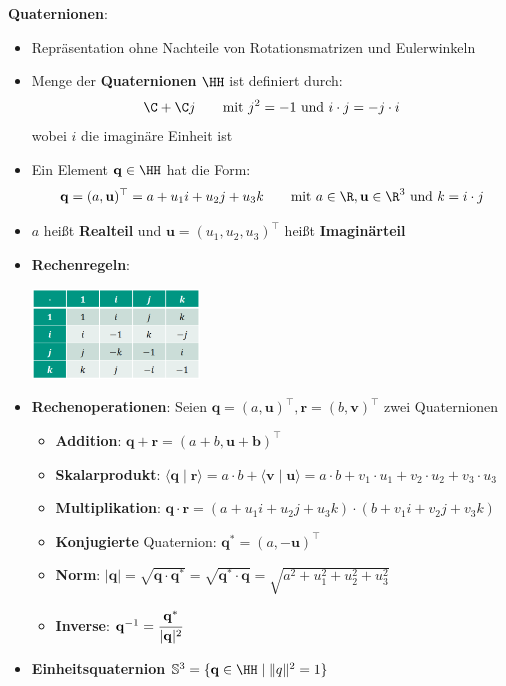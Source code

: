 \bigskip
\textbf{Quaternionen}:
\begin{itemize}
	\item Repräsentation ohne Nachteile von Rotationsmatrizen und Eulerwinkeln
	\item Menge der \textbf{Quaternionen} $\HH$ ist definiert durch:
	$$\C+\C j\qquad \text{mit } j^2=-1 \text{ und } i\cdot j=-j\cdot i$$
	wobei $i$ die imaginäre Einheit ist
	\item Ein Element $\mathbf{q}\in\HH$ hat die Form:
	$$\mathbf{q}=(a,\mathbf{u})^\top=a+u_1i+u_2j+u_3k\qquad \text{mit } a\in\R,\mathbf{u}\in\R^3\text{ und }k=i\cdot j$$
	\item $a$ heißt \textbf{Realteil} und $\mathbf{u}=(u_1,u_2,u_3)^\top$ heißt \textbf{Imaginärteil}
	\item \textbf{Rechenregeln}:
	\begin{center}
		\includegraphics[width=0.35\textwidth]{images/quaternionen.png}
	\end{center}
	\item \textbf{Rechenoperationen}: Seien $\mathbf{q}=(a,\mathbf{u})^\top, \mathbf{r}=(b,\mathbf{v})^\top$ zwei Quaternionen
	\begin{itemize}
		\item \textbf{Addition}: $\mathbf{q}+\mathbf{r}=(a+b,\mathbf{u}+\mathbf{b})^\top$
		\item \textbf{Skalarprodukt}: $\langle \mathbf{q}\mid\mathbf{r}\rangle=a\cdot b+\langle \mathbf{v}\mid\mathbf{u}\rangle=a\cdot b+v_1\cdot u_1+v_2\cdot u_2+v_3\cdot u_3$
		\item \textbf{Multiplikation}: $\mathbf{q}\cdot\mathbf{r}=(a+u_1i+u_2j+u_3k)\cdot (b+v_1i+v_2j+v_3k)$
		\item \textbf{Konjugierte} Quaternion: $\mathbf{q^*}=(a,-\mathbf{u})^\top$
		\item \textbf{Norm}: $|\mathbf{q}|=\sqrt{\mathbf{q}\cdot\mathbf{q^*}}=\sqrt{\mathbf{q^*}\cdot\mathbf{q}}=\sqrt{a^2+u_1^2+u_2^2+u_3^2}$
		\item \textbf{Inverse}: $\mathbf{q}^{-1}=\cfrac{\mathbf{q^*}}{|\mathbf{q}|^2}$
	\end{itemize}
	\item \textbf{Einheitsquaternion} $\mathbb{S}^3=\{\mathbf{q}\in\HH\mid\lVert q \rVert^2=1\}$

\end{itemize}
